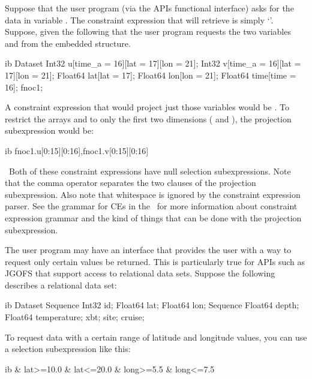 Suppose that the user program (via the APIs functional interface) asks
for the data in variable . The constraint expression that will
retrieve  is simply `'. Suppose, given the following
that the user program requests the two variables 
and  from the embedded structure. 

\begin{vcode}{ib}
Dataset {
    Int32 u[time_a = 16][lat = 17][lon = 21];
    Int32 v[time_a = 16][lat = 17][lon = 21];
    Float64 lat[lat = 17];
    Float64 lon[lon = 21];
    Float64 time[time = 16];
} fnoc1;
\end{vcode}

A constraint expression that would project just those variables would
be . To restrict the arrays  and 
to only the first two dimensions ( and ), the
projection subexpression would be:

\begin{vcode}{ib}
fnoc1.u[0:15][0:16],fnoc1.v[0:15][0:16]
\end{vcode}

\noindent~Both of these
constraint expressions have null selection subexpressions. Note that
the comma operator separates the two clauses of the projection
subexpression. Also note that whitespace is ignored by the constraint
expression parser. See the grammar for CEs in the \OPDuser\ for more
information about constraint expression grammar and the kind of things
that can be done with the projection subexpression.

The user program may have an interface that provides the user with a
way to request only certain values be returned. This is particularly
true for APIs such as JGOFS that support access to relational data
sets. Suppose the following  describes a relational data
set:

\begin{vcode}{ib}
Dataset {
    Sequence {
        Int32 id;
        Float64 lat;
        Float64 lon;
        Sequence {
            Float64 depth;
            Float64 temperature;
        } xbt;
    } site;
} cruise;
\end{vcode}

\noindent To request data with a certain range of latitude
and longitude values, you can use a selection subexpression like
this: 

\begin{vcode}{ib}
& lat>=10.0 & lat<=20.0 & long>=5.5 & long<=7.5
\end{vcode}

